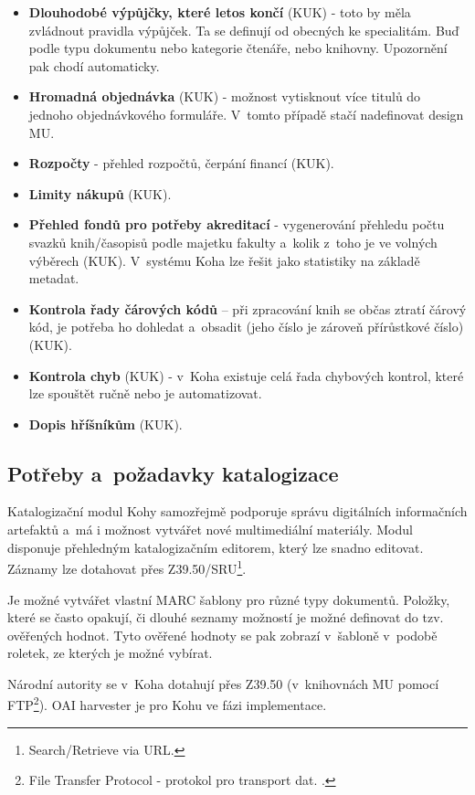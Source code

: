 \documentclass[
	11pt, oneside, printed, final, palatino, monochrome
	microtype,
	table,   %
	lof,     %
	lot     %
]{fithesis3}
\newcommand{\bold}[1]{\textbf{#1}}
\begin{document}
{\begin{itemize}
\item \bold{Dlouhodobé výpůjčky, které letos končí} (KUK) - toto by měla zvládnout pravidla výpůjček. Ta se definují od obecných ke specialitám. Buď podle typu dokumentu nebo kategorie čtenáře, nebo knihovny. Upozornění pak chodí automaticky.
\item \bold{Hromadná objednávka} (KUK) - možnost vytisknout více titulů do jednoho objednávkového formuláře. V~tomto případě stačí nadefinovat design MU.
\item \bold{Rozpočty} - přehled rozpočtů, čerpání financí (KUK).
\item \bold{Limity nákupů} (KUK).
\item \bold{Přehled fondů pro potřeby akreditací} - vygenerování přehledu počtu svazků knih/časopisů podle majetku fakulty a~kolik z~toho je ve volných výběrech (KUK). V~systému Koha lze řešit jako statistiky na základě metadat.
\item \bold{Kontrola řady čárových kódů} – při zpracování knih se občas ztratí čárový kód, je potřeba ho dohledat a~obsadit (jeho číslo je zároveň přírůstkové číslo) (KUK).
\item \bold{Kontrola chyb} (KUK) - v~Koha existuje celá řada chybových kontrol, které lze spouštět ručně nebo je automatizovat.
\item \bold{Dopis hříšníkům} (KUK).
\end{itemize}

\subsection{Potřeby a~požadavky katalogizace}

Katalogizační modul Kohy samozřejmě podporuje správu digitálních informačních artefaktů a~má i možnost vytvářet nové multimediální materiály. Modul disponuje přehledným katalogizačním editorem, který lze snadno editovat. Záznamy lze dotahovat přes Z39.50/SRU\footnote{Search/Retrieve via URL.}. 

Je možné vytvářet vlastní MARC šablony pro různé typy dokumentů. Položky, které se často opakují, či dlouhé seznamy možností je možné definovat do tzv. ověřených hodnot. Tyto ověřené hodnoty se pak zobrazí v~šabloně v~podobě roletek, ze kterých je možné vybírat.

Národní autority se v~Koha dotahují přes Z39.50 (v~knihovnách MU pomocí FTP\footnote{File Transfer Protocol - protokol pro transport dat.
.}). OAI harvester je pro Kohu ve fázi implementace.

}
\end{document}
